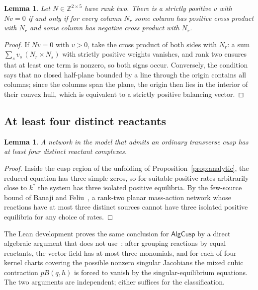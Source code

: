 \documentclass[11pt,a4paper]{article}
\theoremstyle{plain}
\newtheorem{lemma}[theorem]{Lemma}
\theoremstyle{definition}
\theoremstyle{remark}
\numberwithin{equation}{section}
\newcommand{\Z}{\mathbb{Z}}
\newcommand{\AlgCusp}{\mathsf{AlgCusp}}
\begin{document}
\begin{lemma}\label{lem:surround}
Let $N\in\Z^{2\times5}$ have rank two. There is a strictly positive $v$ with $Nv=0$ if and only if for every column $N_r$ some column has positive cross product with $N_r$ and some column has negative cross product with $N_r$.
\end{lemma}
\begin{proof}
If $Nv=0$ with $v>0$, take the cross product of both sides with $N_r$: a sum $\sum_s v_s\,(N_r\times N_s)$ with strictly positive weights vanishes, and rank two ensures that at least one term is nonzero, so both signs occur. Conversely, the condition says that no closed half-plane bounded by a line through the origin contains all columns; since the columns span the plane, the origin then lies in the interior of their convex hull, which is equivalent to a strictly positive balancing vector.
\end{proof}

\subsection{At least four distinct reactants}
\begin{lemma}\label{lem:four}
A network in the model that admits an ordinary transverse cusp has at least four distinct reactant complexes.
\end{lemma}
\begin{proof}
Inside the cusp region of the unfolding of Proposition~\ref{prop:analytic}, the reduced equation has three simple zeros, so for suitable positive rates arbitrarily close to $k^*$ the system has three isolated positive equilibria. By the few-source bound of Banaji and Feliu~\citep[Corollary~4.25]{BF2026}, a rank-two planar mass-action network whose reactions have at most three distinct sources cannot have three isolated positive equilibria for any choice of rates.
\end{proof}

The Lean development proves the same conclusion for $\AlgCusp$ by a direct algebraic argument that does not use~\citep{BF2026}: after grouping reactions by equal reactants, the vector field has at most three monomials, and for each of four kernel charts covering the possible nonzero singular Jacobians the mixed cubic contraction $pB(q,h)$ is forced to vanish by the singular-equilibrium equations. The two arguments are independent; either suffices for the classification.
\end{document}
